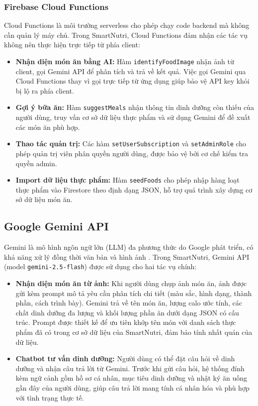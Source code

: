 \subsubsection{Firebase Cloud Functions}

Cloud Functions \cite{firebase_functions} là môi trường serverless cho phép chạy code backend mà không cần quản lý máy chủ. Trong SmartNutri, Cloud Functions đảm nhận các tác vụ không nên thực hiện trực tiếp từ phía client:

\begin{itemize}
    \item \textbf{Nhận diện món ăn bằng AI:} Hàm \texttt{identifyFoodImage} nhận ảnh từ client, gọi Gemini API để phân tích và trả về kết quả. Việc gọi Gemini qua Cloud Functions thay vì gọi trực tiếp từ ứng dụng giúp bảo vệ API key khỏi bị lộ ra phía client.
    \item \textbf{Gợi ý bữa ăn:} Hàm \texttt{suggestMeals} nhận thông tin dinh dưỡng còn thiếu của người dùng, truy vấn cơ sở dữ liệu thực phẩm và sử dụng Gemini để đề xuất các món ăn phù hợp.
    \item \textbf{Thao tác quản trị:} Các hàm \texttt{setUserSubscription} và \texttt{setAdminRole} cho phép quản trị viên phân quyền người dùng, được bảo vệ bởi cơ chế kiểm tra quyền admin.
    \item \textbf{Import dữ liệu thực phẩm:} Hàm \texttt{seedFoods} cho phép nhập hàng loạt thực phẩm vào Firestore theo định dạng JSON, hỗ trợ quá trình xây dựng cơ sở dữ liệu món ăn.
\end{itemize}

\subsection{Google Gemini API}

Gemini là mô hình ngôn ngữ lớn (LLM) đa phương thức do Google phát triển, có khả năng xử lý đồng thời văn bản và hình ảnh \cite{gemini_api}. Trong SmartNutri, Gemini API (model \texttt{gemini-2.5-flash}) được sử dụng cho hai tác vụ chính:

\begin{itemize}
    \item \textbf{Nhận diện món ăn từ ảnh:} Khi người dùng chụp ảnh món ăn, ảnh được gửi kèm prompt mô tả yêu cầu phân tích chi tiết (màu sắc, hình dạng, thành phần, cách trình bày). Gemini trả về tên món ăn, lượng calo ước tính, các chất dinh dưỡng đa lượng và khối lượng phần ăn dưới dạng JSON có cấu trúc. Prompt được thiết kế để ưu tiên khớp tên món với danh sách thực phẩm đã có trong cơ sở dữ liệu của SmartNutri, đảm bảo tính nhất quán của dữ liệu.
    \item \textbf{Chatbot tư vấn dinh dưỡng:} Người dùng có thể đặt câu hỏi về dinh dưỡng và nhận câu trả lời từ Gemini. Trước khi gửi câu hỏi, hệ thống đính kèm ngữ cảnh gồm hồ sơ cá nhân, mục tiêu dinh dưỡng và nhật ký ăn uống gần đây của người dùng, giúp câu trả lời mang tính cá nhân hóa và phù hợp với tình trạng thực tế.
\end{itemize}

